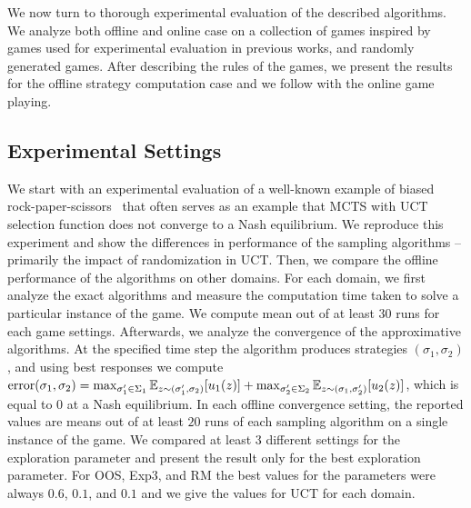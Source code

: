 
We now turn to thorough experimental evaluation of the described algorithms.
We analyze both offline and online case on a collection of games inspired by games used for experimental evaluation in previous works, and randomly generated games.
After describing the rules of the games, we present the results for the offline strategy computation case and we follow with the online game playing.

\subsection{Experimental Settings}


We start with an experimental evaluation of a well-known example of biased rock-paper-scissors~\cite{Shafiei09} that often serves as an example that MCTS with UCT selection function does not converge to a Nash equilibrium.
We reproduce this experiment and show the differences in performance of the sampling algorithms -- primarily the impact of randomization in UCT.
Then, we compare the offline performance of the algorithms on other domains.
For each domain, we first analyze the exact algorithms and measure the computation time taken to solve a particular instance of the game. 
We compute mean out of at least $30$ runs for each game settings. 
Afterwards, we analyze the convergence of the approximative algorithms.
At the specified time step the algorithm produces strategies $(\sigma_1,\sigma_2)$, and using best responses we compute 
$\textrm{error}(\sigma_1,\sigma_2) = \max_{\sigma_1' \in \Sigma_1} \mathbb{E}_{z \sim (\sigma_1',\sigma_2)}[u_1(z)] 
                                   + \max_{\sigma_2' \in \Sigma_2} \mathbb{E}_{z \sim (\sigma_1,\sigma_2')}[u_2(z)]$, 
which is equal to $0$ at a Nash equilibrium.
In each offline convergence setting, the reported values are means out of at least $20$ runs of each sampling algorithm on a single instance of the game.
We compared at least $3$ different settings for the exploration parameter and present the result only for the best exploration parameter.
For OOS, Exp3, and RM the best values for the parameters were always $0.6$, $0.1$, and $0.1$ and we give the values for UCT for each domain.

